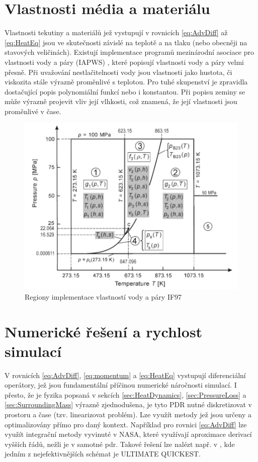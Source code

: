 \section{Vlastnosti média a materiálu}
Vlastnosti tekutiny a materiálů jež vystupují v rovnicích \ref{eq:AdvDiff} až
\ref{eq:HeatEq} jsou ve skutečnosti závislé na teplotě a na tlaku (nebo
obecněji na stavových veličinách). Existují implementace programů mezinárodní
asociace pro vlastnosti vody a páry (IAPWS) \cite{IAPWS2007}, které popisují
vlastnosti vody a páry velmi přesně. Při uvažování nestlačitelnosti vody jsou
vlastnosti jako hustota, či viskozita stále výrazně proměnlivé s teplotou. Pro
tuhé skupenství je zpravidla dostačující popis polynomiální funkcí nebo i
konstantou. Při popisu zeminy se může výrazně projevit vliv její vlhkosti, což
znamená, že její vlastnosti jsou proměnlivé v čase.

\begin{figure}[h] \centering \capstart
  \includegraphics[scale=0.4]{figures/IF97}
  \caption{Regiony implementace vlastností vody a páry IF97 \cite{IAPWS2007}}
  \label{fig:IF97}
\end{figure}

\section{Numerické řešení a rychlost simulací}
\label{sec:NumSpeed}
V rovnicích \ref{eq:AdvDiff}, \ref{eq:momentum} a \ref{eq:HeatEq} vystupují
diferenciální operátory, jež jsou fundamentální příčinou numerické náročnosti
simulací. I přesto, že je fyzika popsaná v sekcích \ref{sec:HeatDynamics},
\ref{sec:PressureLoss} a \ref{sec:SurroundingMass} výrazně zjednodušena, je
tyto PDR nutné diskretizovat v prostoru a čase (tzv. linearizovat problém). Lze
využít metody jež jsou určeny a optimalizovány přímo pro daný kontext.
Například pro rovnici \ref{eq:AdvDiff} lze využít integrační metody vyvinuté v
NASA, které využívají aproximace derivací vyšších řádů, nežli je v samotné
\acrshort{pdr}. Takové řešení lze nalézt např. v \cite{leonard1988}, kde jedním
z nejefektivnějších schémat je ULTIMATE QUICKEST.

